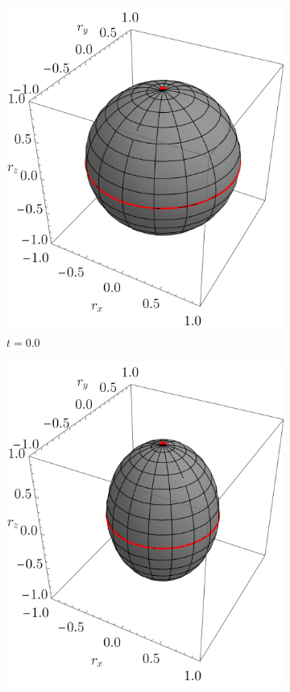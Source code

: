 \begin{figure}[ht!]
    \centering
    \begin{subfigure}{0.32\textwidth}
      \centering
      \includegraphics[width=0.9\linewidth]{chapter3/figures_separable/szxId_t=0._p=0.6_r=0.9.png}
      \caption{$t=0.0$}
    \end{subfigure}%
    \begin{subfigure}{0.32\textwidth}
      \centering
      \includegraphics[width=0.9\linewidth]{chapter3/figures_separable/szxId_t=0.25_p=0.6_r=0.9.png}

\end{subfigure}
\end{figure}
